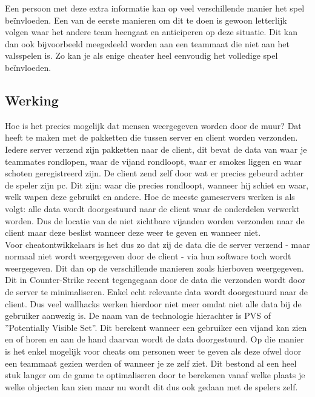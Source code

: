 \documentclass[pdftex,a4paper,12pt,twoside]{report}
\begin{document}
Een persoon met deze extra informatie kan op veel verschillende manier het spel beïnvloeden. Een van de eerste manieren om dit te doen is gewoon letterlijk volgen waar het andere team heengaat en anticiperen op deze situatie. Dit kan dan ook bijvoorbeeld meegedeeld worden aan een teammaat die niet aan het valsspelen is. Zo kan je als enige cheater heel eenvoudig het volledige spel beïnvloeden.


\subsection{Werking}
\label{subsec:werking}
Hoe is het precies mogelijk dat mensen weergegeven worden door de muur? Dat heeft te maken met de pakketten die tussen server en client worden verzonden. Iedere server verzend zijn pakketten naar de client, dit bevat de data van waar je teammates rondlopen, waar de vijand rondloopt, waar er smokes liggen en waar schoten geregistreerd zijn. De client zend zelf door wat er precies gebeurd achter de speler zijn pc. Dit zijn: waar die precies rondloopt, wanneer hij schiet en waar, welk wapen deze gebruikt en andere. Hoe de meeste gameservers werken is als volgt: alle data wordt doorgestuurd naar de client waar de onderdelen verwerkt worden. Dus de locatie van de niet zichtbare vijanden worden verzonden naar de client maar deze beslist wanneer deze weer te geven en wanneer niet.
\\

Voor cheatontwikkelaars is het dus zo dat zij de data die de server verzend - maar normaal niet wordt weergegeven door de client - via hun software toch wordt weergegeven. Dit dan op de verschillende manieren zoals hierboven weergegeven.
\\

Dit in Counter-Strike recent tegengegaan door de data die verzonden wordt door de server te minimaliseren. Enkel echt relevante data wordt doorgestuurd naar de client. Dus veel wallhacks werken hierdoor niet meer omdat niet alle data bij de gebruiker aanwezig is. De naam van de technologie hierachter is PVS of ''Potentially Visible Set''. Dit berekent wanneer een gebruiker een vijand kan zien en of horen en aan de hand daarvan wordt de data doorgestuurd. Op die manier is het enkel mogelijk voor cheats om personen weer te geven als deze ofwel door een teammaat gezien werden of wanneer je ze zelf ziet. Dit bestond al een heel stuk langer om de game te optimaliseren door te berekenen vanaf welke plaats je welke objecten kan zien maar nu wordt dit dus ook gedaan met de spelers zelf. 
\citep{PVS}
\end{document}
